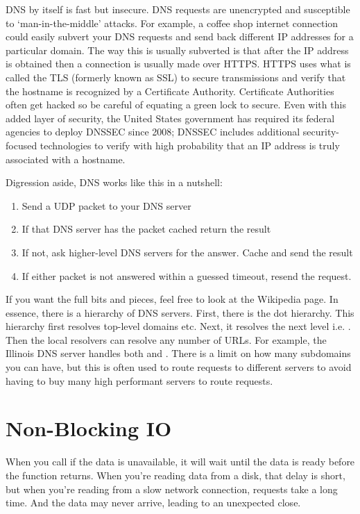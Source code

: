 DNS by itself is fast but insecure.
DNS requests are unencrypted and susceptible to `man-in-the-middle' attacks.
For example, a coffee shop internet connection could easily subvert your DNS requests and send back different IP addresses for a particular domain.
The way this is usually subverted is that after the IP address is obtained then a connection is usually made over HTTPS.
HTTPS uses what is called the TLS (formerly known as SSL) to secure transmissions and verify that the hostname is recognized by a Certificate Authority.
Certificate Authorities often get hacked so be careful of equating a green lock to secure.
Even with this added layer of security, the United States government has required its federal agencies to deploy DNSSEC since 2008; DNSSEC includes additional security-focused technologies to verify with high probability that an IP address is truly associated with a hostname.

Digression aside, DNS works like this in a nutshell:
\begin{enumerate}
\item Send a UDP packet to your DNS server
\item If that DNS server has the packet cached return the result
\item If not, ask higher-level DNS servers for the answer. Cache and send the result
  \item If either packet is not answered within a guessed timeout, resend the request.
\end{enumerate}

If you want the full bits and pieces, feel free to look at the Wikipedia page.
In essence, there is a hierarchy of DNS servers.
First, there is the dot hierarchy.
This hierarchy first resolves top-level domains   etc.
Next, it resolves the next level i.e. .
Then the local resolvers can resolve any number of URLs.
For example, the Illinois DNS server handles both  and . There is a limit on how many subdomains you can have, but this is often used to route requests to different servers to avoid having to buy many high performant servers to route requests.

\section{Non-Blocking IO}

When you call  if the data is unavailable, it will wait until the data is ready before the function returns.
When you're reading data from a disk, that delay is short, but when you're reading from a slow network connection, requests take a long time.
And the data may never arrive, leading to an unexpected close.

